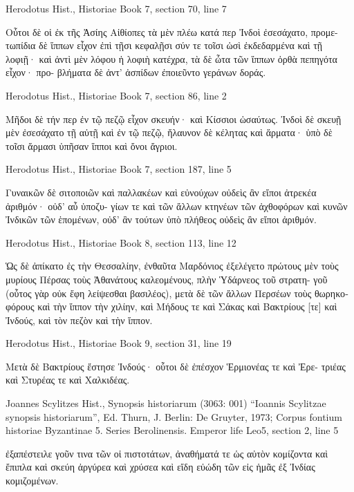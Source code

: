\documentclass[12pt,letterpaper,twoside,final]{memoir}
\begin{document}
\begin{greek}
Herodotus Hist., Historiae 
Book 7, section 70, line 7

                                  Οὗτοι δὲ οἱ ἐκ τῆς Ἀσίης 
Αἰθίοπες τὰ μὲν πλέω κατά περ Ἰνδοὶ ἐσεσάχατο, προμε-
τωπίδια δὲ ἵππων εἶχον ἐπὶ τῇσι κεφαλῇσι σύν τε τοῖσι 
ὠσὶ ἐκδεδαρμένα καὶ τῇ λοφιῇ· καὶ ἀντὶ μὲν λόφου ἡ λοφιὴ 
κατέχρα, τὰ δὲ ὦτα τῶν ἵππων ὀρθὰ πεπηγότα εἶχον· προ-
βλήματα δὲ ἀντ' ἀσπίδων ἐποιεῦντο γεράνων δοράς. 



Herodotus Hist., Historiae 
Book 7, section 86, line 2

                                                 Μῆδοι δὲ τήν 
περ ἐν τῷ πεζῷ εἶχον σκευήν· καὶ Κίσσιοι ὡσαύτως. Ἰνδοὶ 
δὲ σκευῇ μὲν ἐσεσάχατο τῇ αὐτῇ καὶ ἐν τῷ πεζῷ, ἤλαυνον 
δὲ κέλητας καὶ ἅρματα· ὑπὸ δὲ τοῖσι ἅρμασι ὑπῆσαν ἵπποι 
καὶ ὄνοι ἄγριοι. 



Herodotus Hist., Historiae 
Book 7, section 187, line 5

           Γυναικῶν δὲ σιτοποιῶν καὶ παλλακέων καὶ 
εὐνούχων οὐδεὶς ἂν εἴποι ἀτρεκέα ἀριθμόν· οὐδ' αὖ ὑποζυ-
γίων τε καὶ τῶν ἄλλων κτηνέων τῶν ἀχθοφόρων καὶ κυνῶν 
Ἰνδικῶν τῶν ἑπομένων, οὐδ' ἂν τούτων ὑπὸ πλήθεος οὐδεὶς 
ἂν εἴποι ἀριθμόν. 



Herodotus Hist., Historiae 
Book 8, section 113, line 12

           Ὡς δὲ ἀπίκατο ἐς τὴν Θεσσαλίην, ἐνθαῦτα 
Μαρδόνιος ἐξελέγετο πρώτους μὲν τοὺς μυρίους Πέρσας 
τοὺς Ἀθανάτους καλεομένους, πλὴν Ὑδάρνεος τοῦ στρατη-
γοῦ (οὗτος γὰρ οὐκ ἔφη λείψεσθαι βασιλέος), μετὰ δὲ τῶν 
ἄλλων Περσέων τοὺς θωρηκοφόρους καὶ τὴν ἵππον τὴν 
χιλίην, καὶ Μήδους τε καὶ Σάκας καὶ Βακτρίους [τε] καὶ 
Ἰνδούς, καὶ τὸν πεζὸν καὶ τὴν ἵππον. 



Herodotus Hist., Historiae 
Book 9, section 31, line 19

                                   Μετὰ δὲ Βακτρίους 
ἔστησε Ἰνδούς· οὗτοι δὲ ἐπέσχον Ἑρμιονέας τε καὶ Ἐρε-
τριέας καὶ Στυρέας τε καὶ Χαλκιδέας. 



Joannes Scylitzes Hist., Synopsis historiarum (3063: 001)
“Ioannis Scylitzae synopsis historiarum”, Ed. Thurn, J.
Berlin: De Gruyter, 1973; Corpus fontium historiae Byzantinae 5. Series Berolinensis.
Emperor life Leo5, section 2, line 5

      ἐξαπέστειλε γοῦν τινα τῶν οἱ πιστοτάτων, ἀναθήματά τε ὡς 
αὐτὸν κομίζοντα καὶ ἔπιπλα καὶ σκεύη ἀργύρεα καὶ χρύσεα καὶ εἴδη 
εὐώδη τῶν εἰς ἡμᾶς ἐξ Ἰνδίας κομιζομένων. 




\end{greek}
\end{document}
